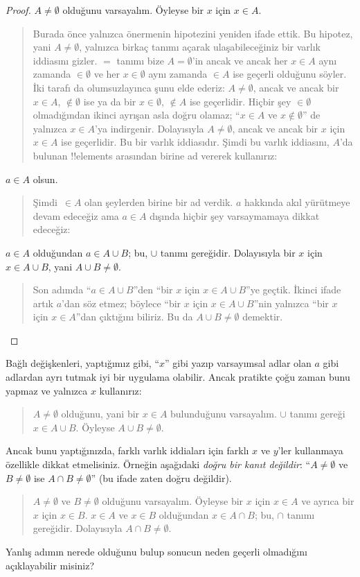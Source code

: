 \documentclass[../../../include/open-logic-section]{subfiles}
\begin{document}
\begin{proof}
  $A \neq \emptyset$ olduğunu varsayalım. Öyleyse bir $x$ için $x \in A$.
  \begin{quote}
    Burada önce yalnızca önermenin hipotezini yeniden ifade ettik. Bu
    hipotez, yani $A \neq \emptyset$, yalnızca birkaç tanımı açarak
    ulaşabileceğiniz bir varlık iddiasını gizler. $=$ tanımı bize $A =
    \emptyset$'in ancak ve ancak her $x \in A$ aynı zamanda $\in
    \emptyset$ ve her $x \in \emptyset$ aynı zamanda $\in A$ ise geçerli
    olduğunu söyler. İki tarafı da olumsuzlayınca şunu elde ederiz: $A
    \neq \emptyset$, ancak ve ancak bir $x \in A$, $\notin \emptyset$
    ise ya da bir $x \in \emptyset$, $\notin A$ ise geçerlidir. Hiçbir
    şey $\in \emptyset$ olmadığından ikinci ayrışan asla doğru olamaz;
    ``$x \in A$ ve $x \notin \emptyset$'' de yalnızca $x \in A$'ya
    indirgenir. Dolayısıyla $A \neq \emptyset$, ancak ve ancak bir $x$
    için $x \in A$ ise geçerlidir. Bu bir varlık iddiasıdır. Şimdi bu
    varlık iddiasını, $A$'da bulunan !!{element}s arasından birine ad vererek kullanırız:
  \end{quote}
  $a \in A$ olsun.
  \begin{quote}
    Şimdi~$\in A$ olan şeylerden birine bir ad verdik. $a$ hakkında
    akıl yürütmeye devam edeceğiz ama $a \in A$ dışında hiçbir şey
    varsaymamaya dikkat edeceğiz:
  \end{quote}
  $a \in A$ olduğundan $a \in A \cup B$; bu, $\cup$ tanımı gereğidir.
  Dolayısıyla bir $x$ için $x \in A \cup B$, yani $A \cup B \neq
  \emptyset$.
  \begin{quote}
    Son adımda ``$a \in A \cup B$''den ``bir $x$ için $x \in A \cup
    B$''ye geçtik. İkinci ifade artık $a$'dan söz etmez; böylece ``bir
    $x$ için $x \in A \cup B$''nin yalnızca ``bir $x$ için $x \in A$''dan
    çıktığını biliriz. Bu da $A \cup B \neq \emptyset$ demektir.
  \end{quote}
\end{proof}

Bağlı değişkenleri, yaptığımız gibi, ``$x$'' gibi yazıp varsayımsal
adlar olan $a$ gibi adlardan ayrı tutmak iyi bir uygulama olabilir.
Ancak pratikte çoğu zaman bunu yapmaz ve yalnızca $x$ kullanırız:
\begin{quote}
$A \neq \emptyset$ olduğunu, yani bir $x \in A$ bulunduğunu varsayalım.
$\cup$ tanımı gereği $x \in A \cup B$. Öyleyse $A \cup B \neq
\emptyset$.
\end{quote}
Ancak bunu yaptığınızda, farklı varlık iddiaları için farklı $x$ ve
$y$'ler kullanmaya özellikle dikkat etmelisiniz. Örneğin aşağıdaki
\emph{doğru bir kanıt değildir}: ``$A \neq \emptyset$ ve $B \neq
\emptyset$ ise $A \cap B \neq \emptyset$'' (bu ifade zaten doğru değildir).
\begin{quote}
$A \neq \emptyset$ ve $B \neq \emptyset$ olduğunu varsayalım. Öyleyse
bir $x$ için $x \in A$ ve ayrıca bir $x$ için $x \in B$. $x \in A$ ve
$x \in B$ olduğundan $x \in A \cap B$; bu, $\cap$ tanımı gereğidir.
Dolayısıyla $A \cap B \neq \emptyset$.
\end{quote}
Yanlış adımın nerede olduğunu bulup sonucun neden geçerli olmadığını
açıklayabilir misiniz?
\end{document}
